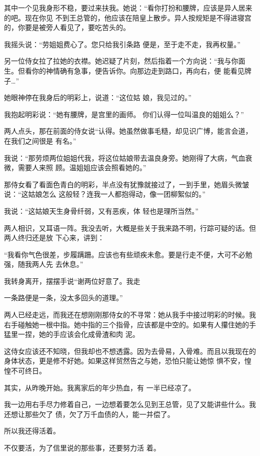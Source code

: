 \documentclass{article}
\begin{document}
其中一个见我身形不稳，要过来扶我。她说：“看你打扮和腰牌，应该是异人居来的吧。现在你见
\newpage
不到王总管的，他应该在陪皇上散步。异人按规矩是不得进寝宫的，你要是被旁人看见了，要吃苦头的。

我摇头说：“劳姐姐费心了。您只给我引条路
便是，至于走不走，我再权量。” 

另一位侍女拉了拉她的衣襟。她迟疑了片刻，然后指着一个方向说：“我与你面生。但看你的神情确有急事，便告诉你。向那边走到路口，再向右，便
能看见牌子…” 

她眼神停在我身后的明彩上，说道：“这位姑
娘，我见过的。” 

我抱起明彩说：“她有腰牌，是宫里的画师。
你们认得一位叫温良的姐姐么？” 

两人点头，那在前面的侍女说“认得。她虽然做事毛糙，却见识广博，能言会道，在我们之间很是
有名。” 

\newpage

我说：“那劳烦两位姐姐代我，将这位姑娘带去温良身旁。她刚得了大病，气血衰微，需要人来照
顾。温姐姐应该会照看她的。” 

那侍女看了看面色青白的明彩，半点没有犹豫就接过了，一到手里，她眉头微皱说：“这姑娘怎么
这般轻？连我一人都抱得动，像一团柳絮似的。” 

我说：“这姑娘天生身骨纤弱，又有恶疾，体
轻也是理所当然。” 

两人相识，又耳语一阵。我没去听，大概是些关于我来路不明，行踪可疑的话。但两人终归还是放
下心来，讲到： 

“我看你气色很差，步履蹒跚。应该也有些顽疾未愈。要是行走不便，大可不必勉强，随我两人先
去休息。” 

我转身离开，摆摆手说“谢两位好意了。我走

\newpage
一条路便是一条，没太多回头的道理。” 

两人已经走远，而我还在想刚刚那侍女的不寻常：她从我手中接过明彩的时候。我右手碰触她一根中指。她中指的三个指骨，应该都是中空的。如果有人攥住她的手猛里一捏，她的手应该会化成骨渣和肉
泥。 

这侍女应该还不知晓，但我却也不想透露。因为去骨易，入骨难。而且以我现在的身体状态，更是修不好她。如果这样贸然告之与她，恐怕只能让她惊
惧不安，惶惶不可终日。 

其实，从昨晚开始。我离家后的年少热血，有
一半已经凉了。 

我一边用右手尽力修着自己，一边想着要怎么见到王总管，见了又能讲些什么。我还想让那些欠了
债，欠了万千血债的人，能一并偿了。 


所以我还得活着。 

\newpage

不仅要活，为了信里说的那些事，还要努力活
着。 
\end{document}
